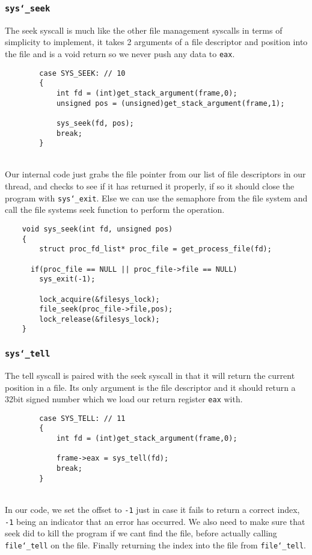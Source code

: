 \documentclass[]{article}
\begin{document}
		   
  \subsubsection{\texttt{sys\char`_seek}}
  
  The seek syscall is much like the other file management syscalls in terms of simplicity to implement, it takes 2 arguments of a file descriptor and position into the file and is a void return so we never push any data to \texttt{eax}.
  
  			\lstset{language=C, tabsize=2}  
		    \begin{lstlisting}   
		case SYS_SEEK: // 10
		{
			int fd = (int)get_stack_argument(frame,0);
			unsigned pos = (unsigned)get_stack_argument(frame,1);
		
			sys_seek(fd, pos);
			break;
		}
		   \end{lstlisting}	
  \textbf{}\\
  Our internal code just grabs the file pointer from our list of file descriptors in our thread, and checks to see if it has returned it properly, if so it should close the program with \texttt{sys\char`_exit}. Else we can use the semaphore from the file system and call the file systems seek function to perform the operation.\\
			\lstset{language=C, tabsize=2}  
		    \begin{lstlisting}   
	void sys_seek(int fd, unsigned pos)
	{
		struct proc_fd_list* proc_file = get_process_file(fd);
		
	  if(proc_file == NULL || proc_file->file == NULL)
	  	sys_exit(-1);
	  
		lock_acquire(&filesys_lock);
		file_seek(proc_file->file,pos);
		lock_release(&filesys_lock);
	}

		   \end{lstlisting}	  
		   \newpage
		   
		   
  \subsubsection{\texttt{sys\char`_tell}}
   
   The tell syscall is paired with the seek syscall in that it will return the current position in a file. Its only argument is the file descriptor and it should return a 32bit signed number which we load our return register \texttt{eax} with.
  
  			\lstset{language=C, tabsize=2}  
		    \begin{lstlisting}   
		case SYS_TELL: // 11
		{
			int fd = (int)get_stack_argument(frame,0);
		
			frame->eax = sys_tell(fd);
			break;
		}
		   \end{lstlisting}	
		   \texttt{}\\
		   In our code, we set the offset to \texttt{-1} just in case it fails to return a correct index, \texttt{-1} being an indicator that an error has occurred. We also need to make sure that seek did to kill the program if we cant find the file, before actually calling \texttt{file\char`_tell} on the file. Finally returning the index into the file from \texttt{file\char`_tell}.
  
\end{document}
